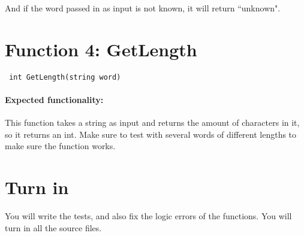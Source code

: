 \documentclass[a4paper,12pt]{book}
\begin{document}
        And if the word passed in as input is not known, it will return ``unknown".
    
    \newpage
    
    \section*{Function 4: GetLength}
    
        \begin{verbatim} int GetLength(string word) \end{verbatim}

        \paragraph{Expected functionality:} This function takes a string
        as input and returns the amount of characters in it, so it returns an int.
        Make sure to test with several words of different lengths to make sure
        the function works.

    \hrulefill

    \section*{Turn in}

    You will write the tests, and also fix the logic errors of the functions.
    You will turn in all the source files.
    
\end{document}
